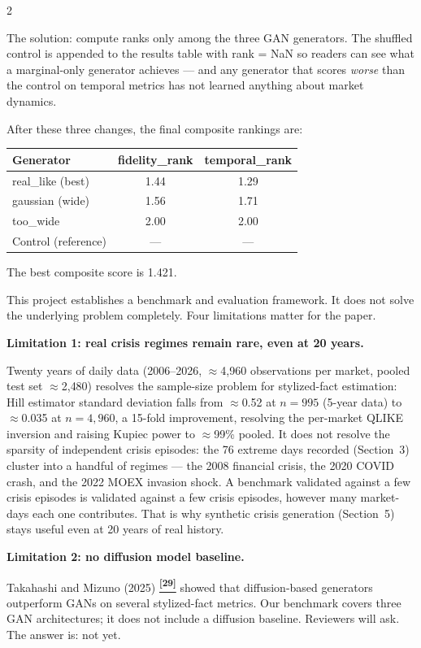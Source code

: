 \documentclass[10pt]{article}
\newcommand{\purplebox}[2]{\begin{tcolorbox}[mybox={Purple}{LBg},title={#1}]#2\end{tcolorbox}}
\newcommand{\tcite}[1]{%
  \hyperlink{R:#1}{\textsuperscript{\scriptsize\textbf{[#1]}}}}
\begin{document}
\begin{multicols}{2}
{The solution: compute ranks only among the three GAN generators. The shuffled control is appended to the results table with rank = NaN so readers can see what a marginal-only generator achieves --- and any generator that scores \emph{worse} than the control on temporal metrics has not learned anything about market dynamics.

\medskip
After these three changes, the final composite rankings are:

\begin{tabular}{@{}lcc@{}}
\toprule
Generator & fidelity\_rank & temporal\_rank \\
\midrule
real\_like (best)  & 1.44 & 1.29 \\
gaussian (wide)    & 1.56 & 1.71 \\
too\_wide          & 2.00 & 2.00 \\
\midrule
Control (reference) & --- & --- \\
\bottomrule
\end{tabular}

\smallskip
The best composite score is 1.421.}

\columnbreak

\purplebox{9\quad What We Still Cannot Do}{%
This project establishes a benchmark and evaluation framework. It does not solve the underlying problem completely. Four limitations matter for the paper.

\medskip
\textbf{Limitation 1: real crisis regimes remain rare, even at 20 years.}

Twenty years of daily data (2006--2026, $\approx$4{,}960 observations per market, pooled test set $\approx$2{,}480) resolves the sample-size problem for stylized-fact estimation: Hill estimator standard deviation falls from $\approx$0.52 at $n=995$ (5-year data) to $\approx$0.035 at $n=4{,}960$, a 15-fold improvement, resolving the per-market QLIKE inversion and raising Kupiec power to $\approx$99\% pooled. It does not resolve the sparsity of independent crisis episodes: the 76 extreme days recorded (Section~3) cluster into a handful of regimes --- the 2008 financial crisis, the 2020 COVID crash, and the 2022 MOEX invasion shock. A benchmark validated against a few crisis episodes is validated against a few crisis episodes, however many market-days each one contributes. That is why synthetic crisis generation (Section~5) stays useful even at 20 years of real history.

\medskip
\textbf{Limitation 2: no diffusion model baseline.}

Takahashi and Mizuno (2025)\tcite{29} showed that diffusion-based generators outperform GANs on several stylized-fact metrics. Our benchmark covers three GAN architectures; it does not include a diffusion baseline. Reviewers will ask. The answer is: not yet.

}
\end{multicols}
\end{document}
